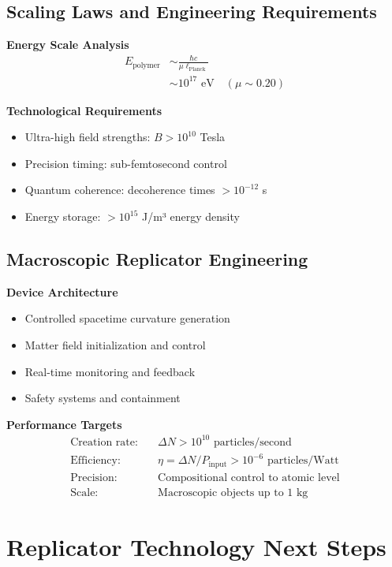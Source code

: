 \documentclass[11pt]{article}
\begin{document}
\subsection{Scaling Laws and Engineering Requirements}

\textbf{Energy Scale Analysis}
\begin{align}
E_{\text{polymer}} &\sim \frac{\hbar c}{\mu \ell_{\text{Planck}}} \\
&\sim 10^{17} \text{ eV} \quad (\mu \sim 0.20)
\end{align}

\textbf{Technological Requirements}
\begin{itemize}
\item Ultra-high field strengths: $B > 10^{10}$ Tesla
\item Precision timing: sub-femtosecond control
\item Quantum coherence: decoherence times $> 10^{-12}$ s
\item Energy storage: $> 10^{15}$ J/m³ energy density
\end{itemize}

\subsection{Macroscopic Replicator Engineering}

\textbf{Device Architecture}
\begin{itemize}
\item Controlled spacetime curvature generation
\item Matter field initialization and control
\item Real-time monitoring and feedback
\item Safety systems and containment
\end{itemize}

\textbf{Performance Targets}
\begin{align}
\text{Creation rate:} &\quad \Delta N > 10^{10} \text{ particles/second} \\
\text{Efficiency:} &\quad \eta = \Delta N / P_{\text{input}} > 10^{-6} \text{ particles/Watt} \\
\text{Precision:} &\quad \text{Compositional control to atomic level} \\
\text{Scale:} &\quad \text{Macroscopic objects up to 1 kg}
\end{align}

\section{Replicator Technology Next Steps}
\end{document}
